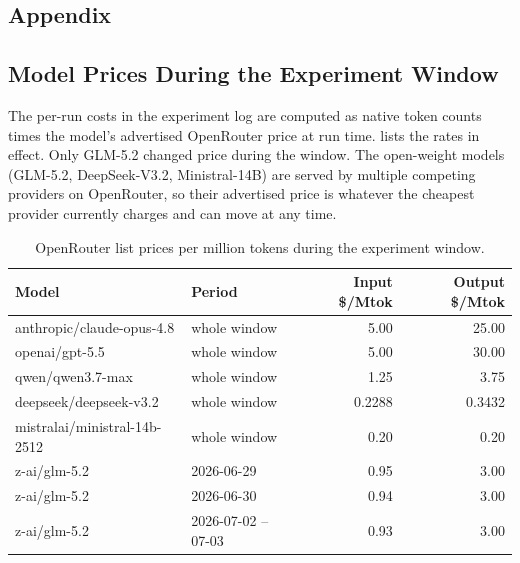 \makeatletter
\setlength{\@fptop}{0pt}
\makeatother

\begin{appendix} %
\section{Appendix}
\label{sec:appendix}

\subsection{Model Prices During the Experiment Window}
\label{app:model-prices}

The per-run costs in the experiment log are computed as native token counts times the model's
advertised OpenRouter price at run time.  lists the rates in effect.
Only GLM-5.2 changed price during the window. The open-weight models (GLM-5.2, DeepSeek-V3.2,
Ministral-14B) are served by multiple competing providers on OpenRouter, so their advertised
price is whatever the cheapest provider currently charges and can move at any time.

\begin{table}[htbp]
\centering
\small
\begin{tabular}{@{}llrr@{}}
\toprule
\textbf{Model} & \textbf{Period} & \textbf{Input \$/Mtok} & \textbf{Output \$/Mtok} \\
\midrule
anthropic/claude-opus-4.8    & whole window          & 5.00   & 25.00 \\
openai/gpt-5.5               & whole window          & 5.00   & 30.00 \\
qwen/qwen3.7-max             & whole window          & 1.25   & 3.75  \\
deepseek/deepseek-v3.2       & whole window          & 0.2288 & 0.3432 \\
mistralai/ministral-14b-2512 & whole window          & 0.20   & 0.20  \\
z-ai/glm-5.2                 & 2026-06-29            & 0.95   & 3.00  \\
z-ai/glm-5.2                 & 2026-06-30            & 0.94   & 3.00  \\
z-ai/glm-5.2                 & 2026-07-02 -- 07-03   & 0.93   & 3.00  \\
\bottomrule
\end{tabular}
\caption{OpenRouter list prices per million tokens during the experiment window.}
\label{tab:recovered-rates}
\end{table}


\end{appendix}
